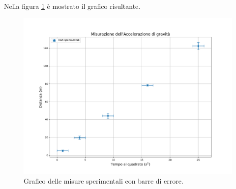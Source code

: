 Nella figura \ref{fig:grafico_misure} è mostrato il grafico risultante.

\begin{figure}[h!]
    \centering
    \includegraphics[width=\textwidth]{grafico_misure.png}
    \caption{Grafico delle misure sperimentali con barre di errore.}
    \label{fig:grafico_misure}
\end{figure}


